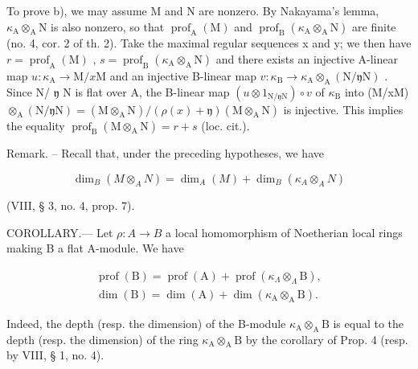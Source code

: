 To prove b), we may assume M and N are nonzero. By Nakayama's lemma, \(\kappa_{\mathrm{A}} \otimes_{\mathrm{A}} \mathrm{N}\) is also nonzero, so that \(\operatorname{prof}_{\mathrm{A}}(\mathrm{M})\) and \(\operatorname{prof}_{\mathrm{B}}(\kappa_{\mathrm{A}} \otimes_{\mathrm{A}} \mathrm{N})\) are finite (no. 4, cor. 2 of th. 2). Take the maximal regular sequences x and y; we then have \(r = \operatorname{prof}_{\mathrm{A}}(\mathrm{M})\) , \(s = \operatorname{prof}_{\mathrm{B}}(\kappa_{\mathrm{A}} \otimes_{\mathrm{A}} \mathrm{N})\) and there exists an injective A-linear map \(u: \kappa_{\mathrm{A}} \to \mathrm{M} / x \mathrm{M}\) and an injective B-linear map \(v: \kappa_{\mathrm{B}} \to \kappa_{\mathrm{A}} \otimes_{\mathrm{A}} (\mathrm{N} / \mathfrak{y} \mathrm{N})\) . Since N/ \(\mathfrak{y}\) N is flat over A, the B-linear map \((u \otimes 1_{\mathrm{N} / \mathfrak{y} \mathrm{N}}) \circ v\) of \(\kappa_{\mathrm{B}}\) into (M/xM) \(\otimes_{\mathrm{A}} (\mathrm{N} / \mathfrak{y} \mathrm{N}) = (\mathrm{M} \otimes_{\mathrm{A}} \mathrm{N}) / (\rho(x) + \mathfrak{y})(\mathrm{M} \otimes_{\mathrm{A}} \mathrm{N})\) is injective. This implies the equality \(\operatorname{prof}_{\mathrm{B}}(\mathrm{M} \otimes_{\mathrm{A}} \mathrm{N}) = r + s\) (loc. cit.).

Remark. -- Recall that, under the preceding hypotheses, we have

\[
\dim_ {B} (M \otimes_ {A} N) = \dim_ {A} (M) + \dim_ {B} (\kappa_ {A} \otimes_ {A} N)
\]

(VIII, § 3, no. 4, prop. 7).

COROLLARY.--- Let \(\rho: A \to B\) a local homomorphism of Noetherian local rings making B a flat A-module. We have

\[
\begin{array}{l} \operatorname{prof} (\mathrm{B}) = \operatorname{prof} (\mathrm{A}) + \operatorname{prof} \left(\kappa_ {\Lambda} \otimes_ {\Lambda} \mathrm{B}\right), \\ \dim (\mathrm{B}) = \dim (\mathrm{A}) + \dim \left(\kappa_ {\mathrm{A}} \otimes_ {\mathrm{A}} \mathrm{B}\right). \end{array}
\]

Indeed, the depth (resp. the dimension) of the B-module \(\kappa_{\mathrm{A}}\otimes_{\mathrm{A}}\mathrm{B}\) is equal to the depth (resp. the dimension) of the ring \(\kappa_{\mathrm{A}}\otimes_{\mathrm{A}}\mathrm{B}\) by the corollary of Prop. 4 (resp. by VIII, § 1, no. 4).

